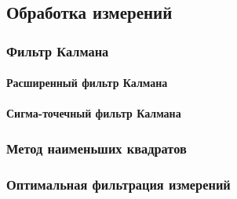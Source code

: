 \subsection{Обработка измерений}

\subsubsection{Фильтр Калмана}

\paragraph{Расширенный фильтр Калмана}

\paragraph{Сигма-точечный фильтр Калмана}

\subsubsection{Метод наименьших квадратов}

\subsubsection{Оптимальная фильтрация измерений}